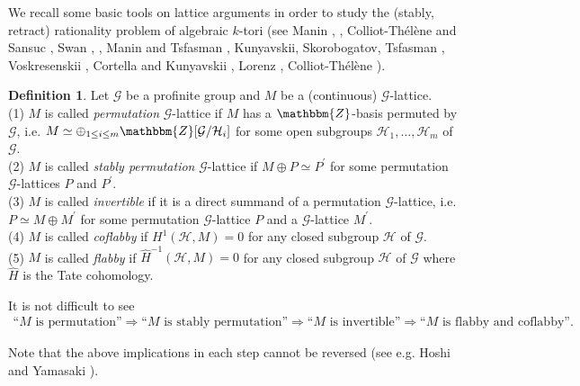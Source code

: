 \documentclass{amsart}
\theoremstyle{plain}
\theoremstyle{definition}
\newtheorem{definition}[theorem]{Definition}
\theoremstyle{remark}
\newcommand{\bZ}{\mathbbm{Z}}\newcommand{\bQ}{\mathbbm{Q}}
\newcounter{sub}\def\tr{\mbox{tr }}
\begin{document}
We recall some basic tools on lattice arguments 
in order to study the %
(stably, retract) rationality problem of algebraic $k$-tori 
(see Manin \cite{Man74}, \cite[Appendix]{Man86}, 
Colliot-Th\'el\`ene and Sansuc \cite[Section 1]{CTS77}, 
Swan \cite[Section 8]{Swa83}, \cite{Swa10}, 
Manin and Tsfasman \cite[Section 4]{MT86}, 
Kunyavskii, Skorobogatov, Tsfasman \cite[Section 2]{KST89}, 
Voskresenskii \cite[Chapter 2]{Vos98}, 
Cortella and Kunyavskii \cite{CK00}, 
Lorenz \cite[Chapter 2]{Lor05}, 
Colliot-Th\'el\`ene \cite[Section 5]{CT07}). 


\begin{definition}
Let $\mathcal{G}$ be a profinite group and $M$ be a (continuous) 
$\mathcal{G}$-lattice.\\ 
(1) $M$ is called {\it permutation} $\mathcal{G}$-lattice 
if $M$ has a $\bZ$-basis
permuted by $\mathcal{G}$, i.e. $M\simeq \oplus_{1\leq i\leq m}\bZ[\mathcal{G}/\mathcal{H}_i]$ 
for some open subgroups $\mathcal{H}_1,\ldots,\mathcal{H}_m$ of $\mathcal{G}$.\\
(2) $M$ is called {\it stably permutation} 
$\mathcal{G}$-lattice if $M\oplus P\simeq P^\prime$ 
for some permutation $\mathcal{G}$-lattices $P$ and $P^\prime$.\\
(3) $M$ is called {\it invertible} 
if it is a direct summand of a permutation $\mathcal{G}$-lattice, 
i.e. $P\simeq M\oplus M^\prime$ for some permutation $\mathcal{G}$-lattice 
$P$ and a $\mathcal{G}$-lattice $M^\prime$.\\ 
(4) $M$ is called {\it coflabby} if $H^1(\mathcal{H},M)=0$
for any closed subgroup $\mathcal{H}$ of $\mathcal{G}$.\\ 
(5) $M$ is called {\it flabby} if $\widehat{H}^{-1}(\mathcal{H},M)=0$ 
for any closed subgroup $\mathcal{H}$ of $\mathcal{G}$ 
where $\widehat{H}$ is the Tate cohomology.
\end{definition}

It is not difficult to see 
\begin{align*}
\textrm{``}M\textrm{\ is\ permutation''}
\Rightarrow
\textrm{``}M\textrm{\ is\ stably\ permutation''}
\Rightarrow 
\textrm{``}M\textrm{\ is\ invertible''}
\Rightarrow
\textrm{``}M\textrm{\ is\ flabby\ and\ coflabby''}.
\end{align*}

Note that the above implications in each step cannot be reversed 
(see e.g. Hoshi and Yamasaki \cite[Chapter 1]{HY17}).\\
\end{document}
